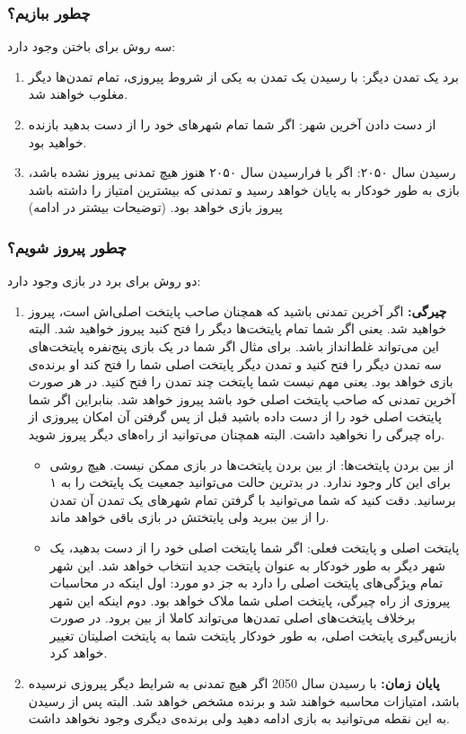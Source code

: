 \documentclass[]{article}
\begin{document}
\subsubsection*{{\titr چطور ببازیم؟}}
سه روش برای باختن وجود دارد:
\begin{enumerate}
	\item برد یک تمدن دیگر: با رسیدن یک تمدن به یکی از شروط پیروزی، تمام تمدن‌ها دیگر مغلوب خواهند شد.
	\item از دست دادن آخرین شهر: اگر شما تمام شهرهای خود را از دست بدهید بازنده خواهید بود.
	\item رسیدن سال ۲۰۵۰: اگر با فرارسیدن سال ۲۰۵۰ هنوز هیچ تمدنی پیروز نشده باشد، بازی به طور خودکار به پایان خواهد رسید و تمدنی که بیشترین امتیاز را داشته باشد پیروز بازی خواهد بود. (توضیحات بیشتر در ادامه)
\end{enumerate}
\subsubsection*{{\titr چطور پیروز شویم؟}}
دو روش برای برد در بازی وجود دارد:
\begin{enumerate}
	\item \textbf{چیرگی:} اگر آخرین تمدنی باشید که همچنان صاحب پایتخت اصلی‌اش است، پیروز خواهید شد. یعنی اگر شما تمام پایتخت‌ها دیگر را فتح کنید پیروز خواهید شد. البته این می‌تواند غلط‌انداز باشد. برای مثال اگر شما در یک بازی پنج‌نفره پایتخت‌های سه تمدن دیگر را فتح کنید و تمدن دیگر پایتخت اصلی شما را فتح کند او برنده‌ی بازی خواهد بود. یعنی مهم نیست شما پایتخت چند تمدن را فتح کنید. در هر صورت آخرین تمدنی که صاحب پایتخت اصلی خود باشد پیروز خواهد شد. بنابراین اگر شما پایتخت اصلی خود را از دست داده باشید قبل از پس گرفتن آن امکان پیروزی از راه چیرگی را نخواهید داشت. البته همچنان می‌توانید از راه‌های دیگر پیروز شوید.
	\begin{itemize}
		\item از بین بردن پایتخت‌ها: از بین بردن پایتخت‌ها در بازی ممکن نیست. هیچ روشی برای این کار وجود ندارد. در بدترین حالت می‌توانید جمعیت یک پایتخت را به ۱ برسانید. دقت کنید که شما می‌توانید با گرفتن تمام شهر‌های یک تمدن آن تمدن را از بین ببرید ولی پایتختش در بازی باقی خواهد ماند.
		\item پایتخت اصلی و پایتخت فعلی: اگر شما پایتخت اصلی خود را از دست بدهید، یک شهر دیگر به طور خودکار به عنوان پایتخت جدید انتخاب خواهد شد. این شهر تمام ویژگی‌های پایتخت اصلی را دارد به  جز دو مورد: اول اینکه در محاسبات پیروزی از راه چیرگی، پایتخت اصلی شما ملاک خواهد بود. دوم اینکه این شهر برخلاف پایتخت‌های اصلی تمدن‌ها می‌تواند کاملا از بین برود. در صورت بازپس‌گیری پایتخت اصلی، به طور خودکار پایتخت شما به پایتخت اصلیتان تغییر خواهد کرد.
	\end{itemize}
	\item \textbf{پایان زمان:} با رسیدن سال 2050 اگر هیچ تمدنی به شرایط دیگر پیروزی نرسیده باشد، امتیازات محاسبه خواهند شد و برنده مشخص خواهد شد. البته پس از رسیدن به این نقطه می‌توانید به بازی ادامه دهید ولی برنده‌‌ی دیگری وجود نخواهد داشت.
\end{enumerate}
\end{document}

